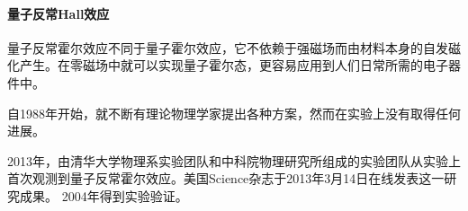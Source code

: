 \paragraph{量子反常Hall效应}
量子反常霍尔效应不同于量子霍尔效应，它不依赖于强磁场而由材料本身的自发磁化产生。在零磁场中就可以实现量子霍尔态，更容易应用到人们日常所需的电子器件中。

自1988年开始，就不断有理论物理学家提出各种方案，然而在实验上没有取得任何进展。

2013年，由清华大学物理系实验团队和中科院物理研究所组成的实验团队从实验上首次观测到量子反常霍尔效应。美国Science杂志于2013年3月14日在线发表这一研究成果。
2004年得到实验验证。